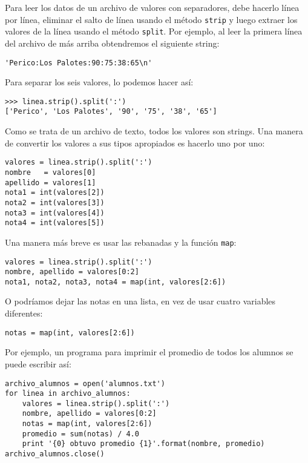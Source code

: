 Para leer los datos de un archivo de valores con separadores, debe
hacerlo línea por línea, eliminar el salto de línea usando el método
\lstinline!strip! y luego extraer los valores de la línea usando el
método \lstinline!split!. Por ejemplo, al leer la primera línea del
archivo de más arriba obtendremos el siguiente string:

\begin{lstlisting}
'Perico:Los Palotes:90:75:38:65\n'
\end{lstlisting}

Para separar los seis valores, lo podemos hacer así:

\begin{lstlisting}
>>> linea.strip().split(':')
['Perico', 'Los Palotes', '90', '75', '38', '65']
\end{lstlisting}

Como se trata de un archivo de texto, todos los valores son strings. Una
manera de convertir los valores a sus tipos apropiados es hacerlo uno
por uno:

\begin{lstlisting}
valores = linea.strip().split(':')
nombre   = valores[0]
apellido = valores[1]
nota1 = int(valores[2])
nota2 = int(valores[3])
nota3 = int(valores[4])
nota4 = int(valores[5])
\end{lstlisting}

Una manera más breve es usar las rebanadas y la función \lstinline!map!:

\begin{lstlisting}
valores = linea.strip().split(':')
nombre, apellido = valores[0:2]
nota1, nota2, nota3, nota4 = map(int, valores[2:6])
\end{lstlisting}

O podríamos dejar las notas en una lista, en vez de usar cuatro
variables diferentes:

\begin{lstlisting}
notas = map(int, valores[2:6])
\end{lstlisting}

Por ejemplo, un programa para imprimir el promedio de todos los alumnos
se puede escribir así:

\begin{lstlisting}
archivo_alumnos = open('alumnos.txt')
for linea in archivo_alumnos:
    valores = linea.strip().split(':')
    nombre, apellido = valores[0:2]
    notas = map(int, valores[2:6])
    promedio = sum(notas) / 4.0
    print '{0} obtuvo promedio {1}'.format(nombre, promedio)
archivo_alumnos.close()
\end{lstlisting}

